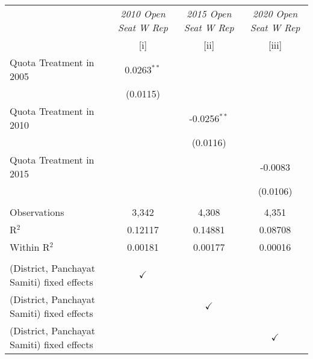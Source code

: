 
\begingroup
\centering
\begin{tabular}{lccc}
   \toprule
                                              & \textit{2010 Open Seat W Rep}  & \textit{2015 Open Seat W Rep}  & \textit{2020 Open Seat W Rep}\\   
                                              & [i]                            & [ii]                           & [iii]\\  
   \midrule 
   Quota Treatment in 2005                    & 0.0263$^{**}$                  &                                &   \\   
                                              & (0.0115)                       &                                &   \\   
   Quota Treatment in 2010                    &                                & -0.0256$^{**}$                 &   \\   
                                              &                                & (0.0116)                       &   \\   
   Quota Treatment in 2015                    &                                &                                & -0.0083\\   
                                              &                                &                                & (0.0106)\\   
    \\
   Observations                               & 3,342                          & 4,308                          & 4,351\\  
   R$^2$                                      & 0.12117                        & 0.14881                        & 0.08708\\  
   Within R$^2$                               & 0.00181                        & 0.00177                        & 0.00016\\  
    \\
   (District, Panchayat Samiti) fixed effects & $\checkmark$                   &                                & \\  
   (District, Panchayat Samiti) fixed effects &                                & $\checkmark$                   & \\  
   (District, Panchayat Samiti) fixed effects &                                &                                & $\checkmark$\\   
   \bottomrule
\end{tabular}
\par\endgroup



